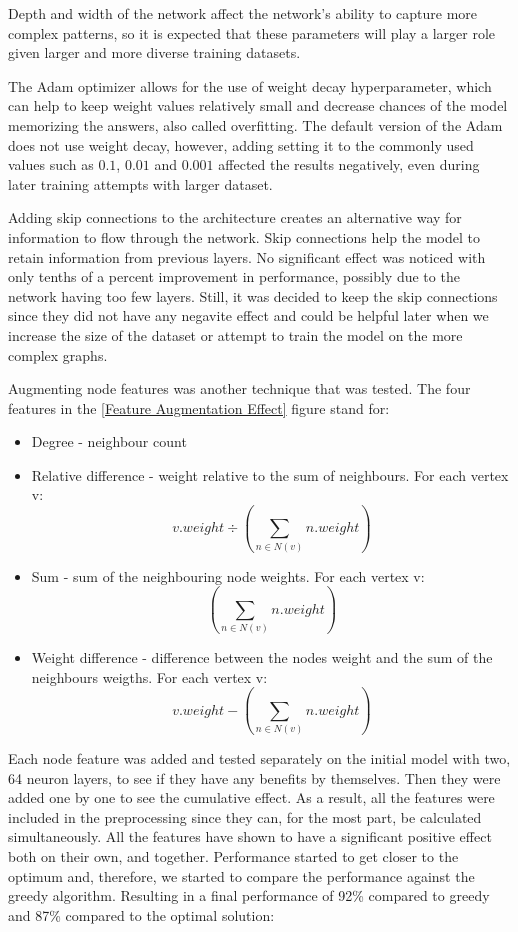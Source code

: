 Depth and width of the network affect the network's ability to capture more complex patterns, so it is expected that these parameters will play a larger role given larger and more diverse training datasets.

The Adam optimizer allows for the use of weight decay hyperparameter, which can help to keep weight values relatively small and decrease chances of the model memorizing the answers, also called overfitting. The default version of the Adam does not use weight decay, however, adding setting it to the commonly used values such as $0.1$, $0.01$ and $0.001$ affected the results negatively, even during later training attempts with larger dataset.

Adding skip connections to the architecture creates an alternative way for information to flow through the network. Skip connections help the model to retain information from previous layers. No significant effect was noticed with only tenths of a percent improvement in performance, possibly due to the network having too few layers. Still, it was decided to keep the skip connections since they did not have any negavite effect and could be helpful later when we increase the size of the dataset or attempt to train the model on the more complex graphs.

Augmenting node features was another technique that was tested. The four features in the \ref{Feature Augmentation Effect} figure stand for: 
\begin{itemize}
\item Degree - neighbour count
\item Relative difference - weight relative to the sum of neighbours. For each vertex v: \[v.weight  \div  (\sum_{n \in N(v)} n.weight) \]
\item Sum - sum of the neighbouring node weights. For each vertex v: \[ (\sum_{n \in N(v)} n.weight) \]
\item Weight difference - difference between the nodes weight and the sum of the neighbours weigths. For each vertex v: \[ v.weight  -  (\sum_{n \in N(v)} n.weight) \]
\end{itemize}
Each node feature was added and tested separately on the initial model with two, 64 neuron layers, to see if they have any benefits by themselves. Then they were added one by one to see the cumulative effect. As a result, all the features were included in the preprocessing since they can, for the most part, be calculated simultaneously. All the features have shown to have a significant positive effect both on their own, and together. Performance started to get closer to the optimum and, therefore, we started to compare the performance against the greedy algorithm. Resulting in a final performance of 92\% compared to greedy and 87\% compared to the optimal solution:

